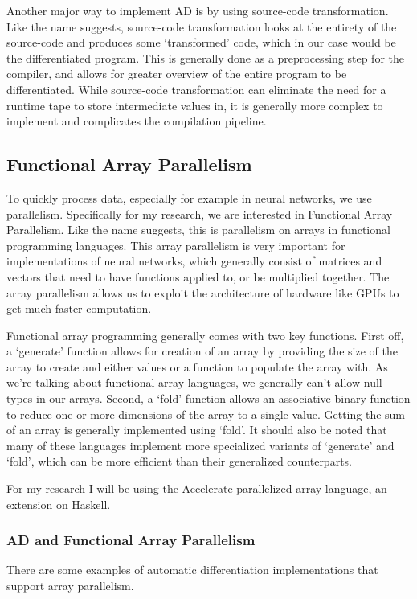 \documentclass{article}
\begin{document}
                Another major way to implement AD is by using source-code transformation.
                Like the name suggests, source-code transformation looks at the entirety of the source-code and produces some `transformed' code, which in our case would be the differentiated program.
                This is generally done as a preprocessing step for the compiler, and allows for greater overview of the entire program to be differentiated.
                While source-code transformation can eliminate the need for a runtime tape to store intermediate values in, it is generally more complex to implement and complicates the compilation pipeline.

        \subsection{Functional Array Parallelism}
            To quickly process data, especially for example in neural networks, we use parallelism.
            Specifically for my research, we are interested in Functional Array Parallelism.
            Like the name suggests, this is parallelism on arrays in functional programming languages.
            This array parallelism is very important for implementations of neural networks, which generally consist of matrices and vectors that need to have functions applied to, or be multiplied together.
            The array parallelism allows us to exploit the architecture of hardware like GPUs to get much faster computation.
            
            Functional array programming generally comes with two key functions.
            First off, a `generate' function allows for creation of an array by providing the size of the array to create and either values or a function to populate the array with.
            As we're talking about functional array languages, we generally can't allow null-types in our arrays.
            Second, a `fold' function allows an associative binary function to reduce one or more dimensions of the array to a single value.
            Getting the sum of an array is generally implemented using `fold'.
            It should also be noted that many of these languages implement more specialized variants of `generate' and `fold', which can be more efficient than their generalized counterparts.

            For my research I will be using the Accelerate parallelized array language, an extension on Haskell.

            \subsubsection{AD and Functional Array Parallelism}
                There are some examples of automatic differentiation implementations that support array parallelism.
                
\end{document}

